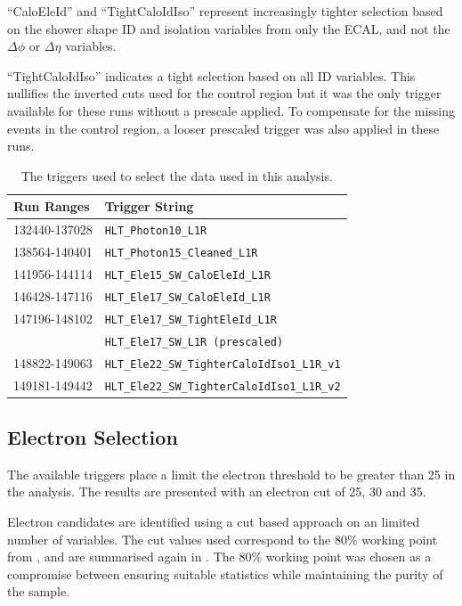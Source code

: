 ``CaloEleId'' and ``TightCaloIdIso'' represent increasingly tighter selection
based on the shower shape ID and isolation variables from only the \ac{ECAL},
and not the $\Delta\phi$ or $\Delta\eta$ variables.  

``TightCaloIdIso'' indicates a tight selection based on all ID variables. 
This nullifies the inverted cuts used for the control region but
it was the only trigger available for these runs without a prescale applied.
To compensate for the missing events in the control region, a looser prescaled
trigger was also applied in these runs.

\begin{table}[htbp]
  \centering
  \begin{tabular}{ l l }
    \toprule
    Run Ranges & Trigger String\\
    \midrule
    132440-137028 & \verb=HLT_Photon10_L1R= \\
    138564-140401 & \verb=HLT_Photon15_Cleaned_L1R= \\
    141956-144114 & \verb=HLT_Ele15_SW_CaloEleId_L1R= \\
    146428-147116 & \verb=HLT_Ele17_SW_CaloEleId_L1R= \\
    147196-148102 & \verb=HLT_Ele17_SW_TightEleId_L1R= \\
                  & \verb=HLT_Ele17_SW_L1R (prescaled)= \\ 
    148822-149063 & \verb=HLT_Ele22_SW_TighterCaloIdIso1_L1R_v1= \\
    149181-149442 & \verb=HLT_Ele22_SW_TighterCaloIdIso1_L1R_v2= \\
    \bottomrule
  \end{tabular}
  \caption{The triggers used to select the data used in this analysis.}
  \label{tab:triggers}
\end{table}

\subsection{Electron Selection}
The available triggers place a limit the electron \pT threshold to be
greater than \unit{25}{\GeV} in the analysis. 
The results are presented with an electron \pT cut of 25, 30
and \unit{35}{\GeV}.

Electron candidates are identified using a cut based approach on an limited
number of variables. The cut values used correspond to the \unit{80}{\%}
working point from , and are summarised again in
. The \unit{80}{\%} working point was chosen as a
compromise between ensuring suitable statistics while maintaining the purity of
the sample.

